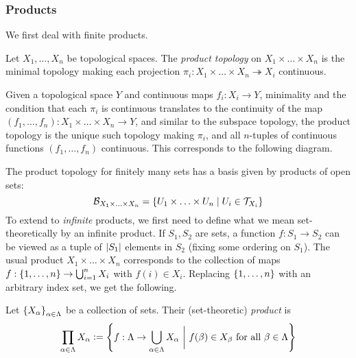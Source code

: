 \documentclass[11pt]{article}
\begin{document}
\subsubsection{Products}
We first deal with finite products.
\begin{definition}
    Let $X_1, \ldots, X_n$ be topological spaces. The \emph{product topology} on $X_1 \times \ldots \times X_n$ is the minimal topology making each projection $\pi_i : X_1 \times \ldots \times X_n \twoheadrightarrow X_i$ continuous.
\end{definition}
Given a topological space $Y$ and continuous maps $f_i : X_i \to Y$, minimality and the condition that each $\pi_i$ is continuous translates to the continuity of the map $(f_1, \ldots, f_n) : X_1 \times \ldots \times X_n \to Y$, and similar to the subspace topology, the product topology is the unique such topology making $\pi_i$, and all $n$-tuples of continuous functions $(f_1, \ldots, f_n)$ continuous. This corresponds to the following diagram.
\begin{center}
\end{center}
The product topology for finitely many sets has a basis given by products of open sets:
$$
    \mathcal{B}_{X_1 \times \ldots \times X_n} = \left\{  U_1 \times \ldots \times U_n \mid U_i \in \mathcal{T}_{X_i}  \right\}
$$
To extend to \emph{infinite} products, we first need to define what we mean set-theoretically by an infinite product. If $S_1, S_2$ are sets, a function $f : S_1 \to S_2$ can be viewed as a tuple of $\left| S_1 \right|$ elements in $S_2$ (fixing some ordering on $S_1$). The usual product $X_1 \times \ldots \times X_n$ corresponds to the collection of maps $f : \left\{  1, \ldots, n  \right\} \to \bigcup_{i = 1}^n X_i$ with $f(i) \in X_i$. Replacing $\left\{  1, \ldots, n  \right\}$ with an arbitrary index set, we get the following.
\begin{definition}
    Let $\left\{  X_\alpha  \right\}_{\alpha \in \Lambda}$ be a collection of sets. Their (set-theoretic) \emph{product} is
    $$
        \prod_{\alpha \in \Lambda} X_\alpha \vcentcolon= \left\{  f : \Lambda \to \bigcup_{\alpha \in \Lambda}X_\alpha \ \bigg| \ f(\beta) \in X_\beta \text{ for all }\beta \in \Lambda  \right\}
    $$
\end{definition}
\end{document}

